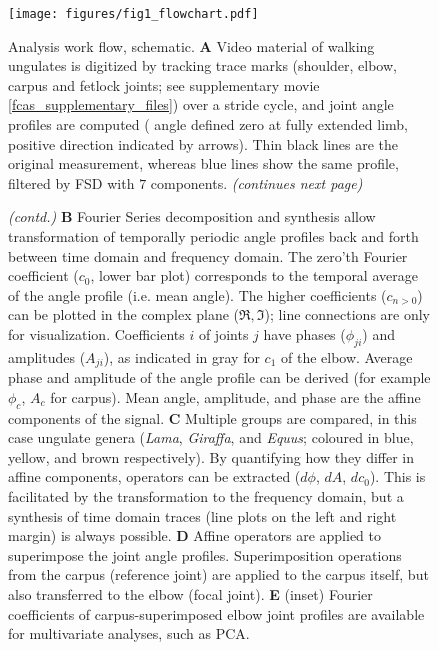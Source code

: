 \begin{figure}[p]
\begin{center}
\texttt{[image: figures/fig1\_flowchart.pdf]}
\end{center}
\caption{Analysis work flow, schematic.
\textbf{A} Video material of walking ungulates is digitized by tracking trace marks (shoulder, elbow, carpus and fetlock joints; see supplementary movie \ref{fcas_supplementary_files}) over a stride cycle, and joint angle profiles are computed ( angle defined zero at fully extended limb, positive direction indicated by arrows). Thin black lines are the original measurement, whereas blue lines show the same profile, filtered by FSD with $7$ components.
\textit{(continues next page)}
  }
\label{fig:workflow}
\end{figure}

\addtocounter{figure}{-1}
\begin{figure}[p]
  \caption{
\textit{(contd.)}
\textbf{B} Fourier Series decomposition and synthesis allow transformation of temporally periodic  angle profiles back and forth between time domain and frequency domain. The zero'th Fourier coefficient ($c_{0}$, lower bar plot) corresponds to the temporal average of the  angle profile (i.e. mean  angle). The higher coefficients ($c_{n>0}$) can be plotted in the complex plane ($\Re, \Im$); line connections are only for visualization. Coefficients $i$ of joints $j$ have phases ($\phi_{ji}$) and amplitudes ($A_{ji}$), as indicated in gray for $c_{1}$ of the elbow. Average phase and amplitude of the  angle profile can be derived (for example $\phi_{c}$, $A_{c}$ for carpus). Mean  angle, amplitude, and phase are the affine components of the signal.
\newline\textbf{C} Multiple groups are compared, in this case ungulate genera (\textit{Lama}, \textit{Giraffa}, and \textit{Equus}; coloured in blue, yellow, and brown respectively). By quantifying how they differ in affine components, operators can be extracted ($d\phi$, $dA$, $dc_{0}$). This is facilitated by the transformation to the frequency domain, but a synthesis of time domain traces (line plots on the left and right margin) is always possible.
\newline \textbf{D} Affine operators are applied to superimpose the joint angle profiles. Superimposition operations from the carpus (reference joint) are applied to the carpus itself, but also transferred to the elbow (focal joint).
\newline\textbf{E} (inset) Fourier coefficients of carpus-superimposed elbow joint profiles are available for multivariate analyses, such as PCA.
  }
\end{figure}




